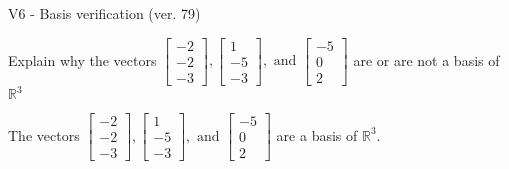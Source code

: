 \begin{exercise}
  \begin{exerciseTitle}V6 - Basis verification (ver. 79)\end{exerciseTitle}
  \begin{exerciseStatement}
    Explain why the vectors \(\left[\begin{array}{r}
-2 \\
-2 \\
-3
\end{array}\right] , \left[\begin{array}{r}
1 \\
-5 \\
-3
\end{array}\right] , \text{ and } \left[\begin{array}{r}
-5 \\
0 \\
2
\end{array}\right]\) are or are not a basis of \(\mathbb{R}^3\)	


  \end{exerciseStatement}
  \begin{exerciseAnswer}
   The vectors \(\left[\begin{array}{r}
-2 \\
-2 \\
-3
\end{array}\right] , \left[\begin{array}{r}
1 \\
-5 \\
-3
\end{array}\right] , \text{ and } \left[\begin{array}{r}
-5 \\
0 \\
2
\end{array}\right]\) 
  	 are  a basis of \(\mathbb{R}^3\).
  


  \end{exerciseAnswer}
\end{exercise}